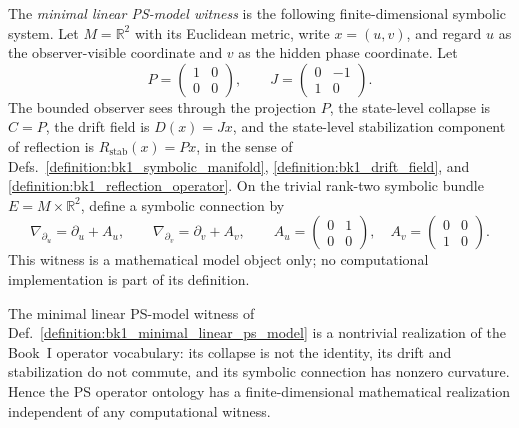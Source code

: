 \begin{definition}
\label{definition:bk1_minimal_linear_ps_model}
The \emph{minimal linear PS-model witness} is the following finite-dimensional
symbolic system.  Let \(M=\mathbb{R}^2\) with its Euclidean metric, write
\(x=(u,v)\), and regard \(u\) as the observer-visible coordinate and \(v\) as
the hidden phase coordinate.  Let
\[
P =
\begin{pmatrix}
1&0\\
0&0
\end{pmatrix},
\qquad
J =
\begin{pmatrix}
0&-1\\
1&0
\end{pmatrix}.
\]
The bounded observer sees through the projection \(P\), the state-level
collapse is \(C=P\), the drift field is \(D(x)=Jx\), and the state-level
stabilization component of reflection is \(R_{\mathrm{stab}}(x)=Px\), in the
sense of Defs.~\ref{definition:bk1_symbolic_manifold},
\ref{definition:bk1_drift_field}, and \ref{definition:bk1_reflection_operator}.
On the trivial rank-two symbolic bundle \(E=M\times\mathbb{R}^2\), define a
symbolic connection by
\[
\nabla_{\partial_u}=\partial_u + A_u,
\qquad
\nabla_{\partial_v}=\partial_v + A_v,
\qquad
A_u =
\begin{pmatrix}
0&1\\
0&0
\end{pmatrix},
\quad
A_v =
\begin{pmatrix}
0&0\\
1&0
\end{pmatrix}.
\]
This witness is a mathematical model object only; no computational
implementation is part of its definition.
\end{definition}

\begin{theorem}
\label{theorem:bk1_nonvacuity_minimal_linear_ps_model}
The minimal linear PS-model witness of
Def.~\ref{definition:bk1_minimal_linear_ps_model} is a nontrivial realization
of the Book~I operator vocabulary: its collapse is not the identity, its drift
and stabilization do not commute, and its symbolic connection has nonzero
curvature.  Hence the PS operator ontology has a finite-dimensional
mathematical realization independent of any computational witness.
\end{theorem}

